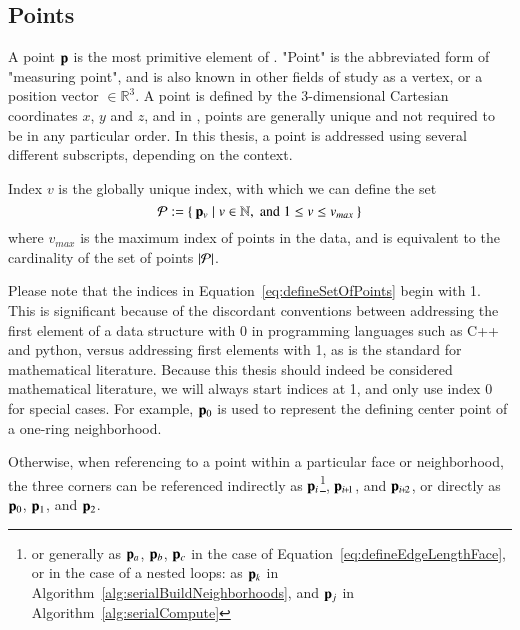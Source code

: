 \subsection{Points}
\label{ch2s3ssP}
A point $\mathbf{p}$ is the most primitive element of \tdd{}. "Point" is the abbreviated form of "measuring point", and is also known in other fields of study as a vertex, or a position vector $\in \mathbb{R}^3$. A point is defined by the 3-dimensional Cartesian coordinates $x$, $y$ and $z$, and in \tdd{}, points are generally unique and not required to be in any particular order. In this thesis, a point is addressed using several different subscripts, depending on the context.

Index $v$ is the globally unique index, with which we can define the set
\begin{equation}
	\mathcal{P} := \left \{\:\mathbf{p}_v \mid v \in \mathbb{N}, \;\text{and}\; 1\leq v \leq v_{max}\:\right \}
	\label{eq:defineSetOfPoints}
\end{equation}
where $v_{max}$ is the maximum index of points in the data, and is equivalent to the cardinality of the set of points $|\mathcal{P}|$.%
%
%

Please note that the indices in Equation~\ref{eq:defineSetOfPoints} begin with 1. This is significant because of the discordant conventions between addressing the first element of a data structure with 0 in programming languages such as C++ and python, versus addressing first elements with 1, as is the standard for mathematical literature. Because this thesis should indeed be considered mathematical literature, we will always start indices at 1, and only use index 0 for special cases. For example, $\mathbf{p}_0$ is used to represent the defining center point of a one-ring neighborhood.

Otherwise,
 when referencing to a point within a particular face or neighborhood, the three corners can be referenced indirectly as $\mathbf{p}_i$\footnote{or generally as $\mathbf{p}_a$, $\mathbf{p}_b$, $\mathbf{p}_c$ in the case of Equation~\ref{eq:defineEdgeLengthFace}, or in the case of a nested loops: as $\mathbf{p}_k$ in Algorithm~\ref{alg:serialBuildNeighborhoods}, and $\mathbf{p}_j$ in Algorithm~\ref{alg:serialCompute}}, $\bp_{\sipo}$, and $\bp_{\sipt}$, or directly as $\mathbf{p}_0$, $\mathbf{p}_1$, and $\mathbf{p}_2$.~\cite[p.~25]{Mara12}%
%
%
%

